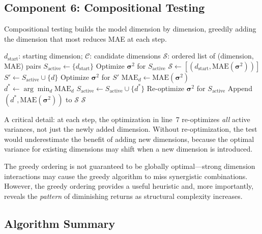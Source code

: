 \documentclass[manuscript,review,anonymous]{acmart}
\newcommand{\MAE}{\mathrm{MAE}}
\begin{document}
\subsection{Component 6: Compositional Testing}

Compositional testing builds the model dimension by dimension, greedily adding the dimension that most reduces MAE at each step.

\begin{algorithm}[t]
\caption{CompositionalTest$(d_{\mathrm{start}}, \mathcal{C})$}
\label{alg:compositional}
\begin{algorithmic}[1]
\REQUIRE $d_{\mathrm{start}}$: starting dimension; $\mathcal{C}$: candidate dimensions
\ENSURE $\mathcal{S}$: ordered list of (dimension, MAE) pairs
\STATE $S_{\mathrm{active}} \leftarrow \{d_{\mathrm{start}}\}$
\STATE Optimize $\boldsymbol{\sigma}^2$ for $S_{\mathrm{active}}$
\STATE $\mathcal{S} \leftarrow [(d_{\mathrm{start}}, \MAE(\boldsymbol{\sigma}^2))]$
        \STATE $S' \leftarrow S_{\mathrm{active}} \cup \{d\}$
        \STATE Optimize $\boldsymbol{\sigma}^2$ for $S'$ 
        \STATE $\MAE_d \leftarrow \MAE(\boldsymbol{\sigma}^2)$
    \ENDFOR
    \STATE $d^* \leftarrow \arg\min_d \MAE_d$
    \STATE $S_{\mathrm{active}} \leftarrow S_{\mathrm{active}} \cup \{d^*\}$
    \STATE Re-optimize $\boldsymbol{\sigma}^2$ for $S_{\mathrm{active}}$
    \STATE Append $(d^*, \MAE(\boldsymbol{\sigma}^2))$ to $\mathcal{S}$
\ENDWHILE
\RETURN $\mathcal{S}$
\end{algorithmic}
\end{algorithm}

A critical detail: at each step, the optimization in line~7 re-optimizes \emph{all} active variances, not just the newly added dimension.
Without re-optimization, the test would underestimate the benefit of adding new dimensions, because the optimal variance for existing dimensions may shift when a new dimension is introduced.

The greedy ordering is not guaranteed to be globally optimal---strong dimension interactions may cause the greedy algorithm to miss synergistic combinations.
However, the greedy ordering provides a useful heuristic and, more importantly, reveals the \emph{pattern} of diminishing returns as structural complexity increases.

\subsection{Algorithm Summary}
\end{document}
